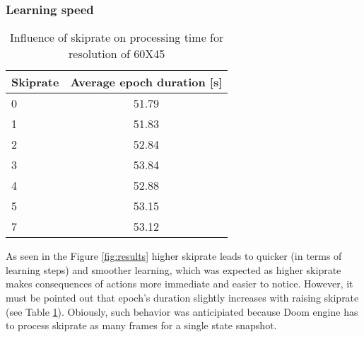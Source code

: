 		\subsubsection*{Learning speed} 
			\begin{table}
				\begin{center}
					\begin{tabular}{ |l | c |}
						\hline
						Skiprate & Average epoch duration [s] \\ \hline
						0 & 51.79 \\ \hline
						1 & 51.83 \\ \hline
						2 & 52.84 \\ \hline
						3 & 53.84 \\ \hline
						4 & 52.88 \\ \hline
						5 & 53.15 \\ \hline
						7 & 53.12 \\ \hline
					\end{tabular}
				\end{center}
				\caption{Influence of skiprate on processing time for resolution of 60X45}\label{tab:time_results}
			\end{table}
			As seen in the Figure \ref{fig:results} higher skiprate leads to quicker (in terms of learning steps) and smoother learning, which was expected as higher skiprate makes consequences of actions more immediate and easier to notice. However, it must be pointed out that epoch's duration slightly increases with raising skiprate (see Table \ref{tab:time_results}). Obiously, such behavior was anticipiated because Doom engine has to process skiprate as many frames for a single state snapshot.

